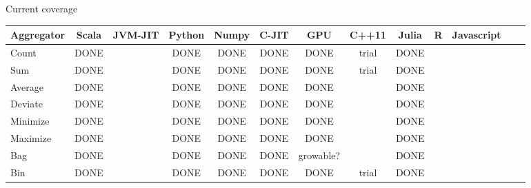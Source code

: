 \documentclass[aspectratio=169]{beamer}
\begin{document}
\begin{frame}{Current coverage}
\vspace{0.4 cm}
\renewcommand{\arraystretch}{1.1}
\scriptsize
\mbox{\hspace{-0.75 cm}}\begin{tabular}{l c c c c c c c c c c c c}
Aggregator        & Scala                      & JVM-JIT & Python                     & Numpy                      & C-JIT                   & GPU                        & C++11                      & Julia & R & Javascript \\\hline\hline
Count             & \cellcolor{yellow!50}DONE  &         & \cellcolor{yellow!50}DONE  & \cellcolor{yellow!50}DONE  & \cellcolor{yellow!50}DONE  & \cellcolor{yellow!50}DONE  & \cellcolor{red!25}trial    & \cellcolor{yellow!50}DONE & & \\
Sum               & \cellcolor{yellow!50}DONE  &         & \cellcolor{yellow!50}DONE  & \cellcolor{yellow!50}DONE  & \cellcolor{yellow!50}DONE  & \cellcolor{yellow!50}DONE  & \cellcolor{red!25}trial    & \cellcolor{yellow!50}DONE & & \\
Average           & \cellcolor{yellow!50}DONE  &         & \cellcolor{yellow!50}DONE  & \cellcolor{yellow!50}DONE  & \cellcolor{yellow!50}DONE  & \cellcolor{yellow!50}DONE  &                            & \cellcolor{yellow!50}DONE & & \\
Deviate           & \cellcolor{yellow!50}DONE  &         & \cellcolor{yellow!50}DONE  & \cellcolor{yellow!50}DONE  & \cellcolor{yellow!50}DONE  & \cellcolor{yellow!50}DONE  &                            & \cellcolor{yellow!50}DONE & & \\
Minimize          & \cellcolor{yellow!50}DONE  &         & \cellcolor{yellow!50}DONE  & \cellcolor{yellow!50}DONE  & \cellcolor{yellow!50}DONE  & \cellcolor{yellow!50}DONE  &                            & \cellcolor{yellow!50}DONE & & \\
Maximize          & \cellcolor{yellow!50}DONE  &         & \cellcolor{yellow!50}DONE  & \cellcolor{yellow!50}DONE  & \cellcolor{yellow!50}DONE  & \cellcolor{yellow!50}DONE  &                            & \cellcolor{yellow!50}DONE & & \\
Bag               & \cellcolor{green!25}DONE   &         & \cellcolor{green!25}DONE   & \cellcolor{green!25}DONE   & \cellcolor{green!25}DONE   & growable?                  &                            & \cellcolor{green!25}DONE  & & \\\hline
Bin               & \cellcolor{yellow!50}DONE  &         & \cellcolor{yellow!50}DONE  & \cellcolor{yellow!50}DONE  & \cellcolor{yellow!50}DONE  & \cellcolor{yellow!50}DONE  & \cellcolor{red!25}trial    & \cellcolor{yellow!50}DONE & & \\

\end{tabular}
\end{frame}
\end{document}
